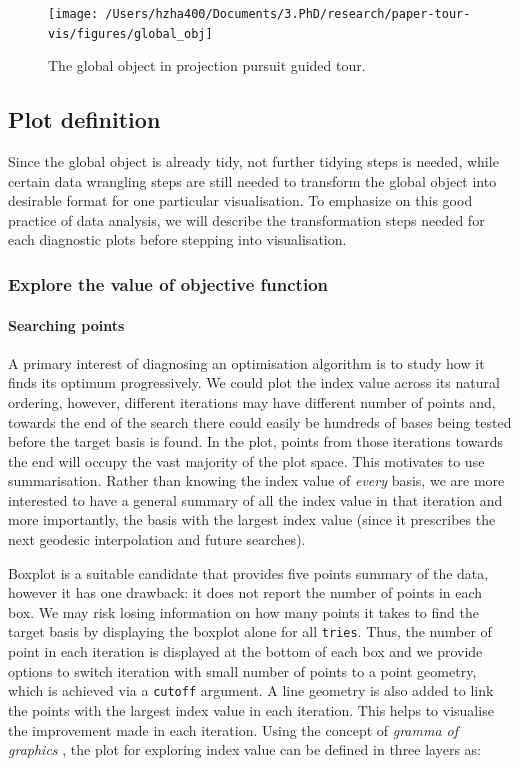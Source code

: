\documentclass[12pt]{article}
\begin{document}
\begin{figure}
\texttt{[image: /Users/hzha400/Documents/3.PhD/research/paper-tour-vis/figures/global\_obj]} \caption{\label{glb-obj}The global object in projection pursuit guided tour.}\label{fig:glb-obj}
\end{figure}

\hypertarget{plot-definition}{%
\subsection{Plot definition}\label{plot-definition}}

Since the global object is already tidy, not further tidying steps is
needed, while certain data wrangling steps
\citep{wickham2016rfordatascience} are still needed to transform the
global object into desirable format for one particular visualisation. To
emphasize on this good practice of data analysis, we will describe the
transformation steps needed for each diagnostic plots before stepping
into visualisation.

\hypertarget{static}{%
\subsubsection{Explore the value of objective function}\label{static}}

\hypertarget{searching-points}{%
\paragraph{Searching points}\label{searching-points}}

A primary interest of diagnosing an optimisation algorithm is to study
how it finds its optimum progressively. We could plot the index value
across its natural ordering, however, different iterations may have
different number of points and, towards the end of the search there
could easily be hundreds of bases being tested before the target basis
is found. In the plot, points from those iterations towards the end will
occupy the vast majority of the plot space. This motivates to use
summarisation. Rather than knowing the index value of \emph{every}
basis, we are more interested to have a general summary of all the index
value in that iteration and more importantly, the basis with the largest
index value (since it prescribes the next geodesic interpolation and
future searches).

Boxplot is a suitable candidate that provides five points summary of the
data, however it has one drawback: it does not report the number of
points in each box. We may risk losing information on how many points it
takes to find the target basis by displaying the boxplot alone for all
\texttt{tries}. Thus, the number of point in each iteration is displayed
at the bottom of each box and we provide options to switch iteration
with small number of points to a point geometry, which is achieved via a
\texttt{cutoff} argument. A line geometry is also added to link the
points with the largest index value in each iteration. This helps to
visualise the improvement made in each iteration. Using the concept of
\emph{gramma of graphics} \citep{wickham2010layered}, the plot for
exploring index value can be defined in three layers as:
\end{document}
